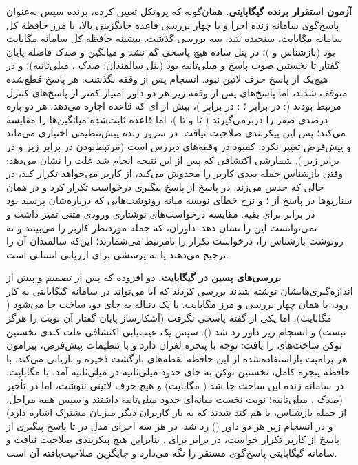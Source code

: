 \textbf{آزمون استقرار برنده  گیگابایتی.} همان‌گونه که پروتکل تعیین کرده، برنده
سپس به‌عنوان پاسخ‌گوی سامانه زنده اجرا و با چهار بررسی قاعده جایگزینی بالا، با مرز
حافظه کل سامانه  مگابایت، سنجیده شد. سه بررسی گذشت. بیشینه حافظه کل
سامانه  مگابایت بود (بازشناس  و  )؛ در
پنل ساده هیچ پاسخی گم نشد و میانگین و صدک  فاصله پایان گفتار تا نخستین صوت
پاسخ  و  میلی‌ثانیه بود (پنل سالمندان: صدک ، 
میلی‌ثانیه)؛ و در هیچ‌یک از  پاسخ حرف لاتین نبود. انسجام پس از وقفه
نگذشت: هر  پاسخ قطع‌شده متوقف شدند، اما پاسخ‌های پس از وقفه زیر هر دو داور
 امتیاز کمتر از پاسخ‌های کنترل مرتبط بودند (:  در برابر
؛ :  در برابر )، بیش از ای که قاعده
اجازه می‌دهد. هر دو بازه  درصدی صفر را دربرمی‌گیرند ( تا 
و  تا )، اما قاعده ثابت‌شده میانگین‌ها را مقایسه می‌کند؛ پس این
پیکربندی صلاحیت نیافت. در سرور زنده پیش‌تنظیمی اختیاری می‌ماند و پیش‌فرض تغییر
نکرد. کمبود در وقفه‌های دیررس است (مرتبط‌بودن  در برابر  زیر
 و  در برابر  زیر ). شمارشی اکتشافی که
پس از این نتیجه انجام شد علت را نشان می‌دهد: وقتی بازشناس جمله بعدی کاربر را
مخدوش می‌کند،  از کاربر می‌خواهد تکرار کند، در حالی که
 حدس می‌زند.  در  پاسخ از  پاسخ پیگیری
درخواست تکرار کرد و  در همان سناریوها در  پاسخ از ؛ و
نرخ خطای نویسه میانه رونوشت‌هایی که  درباره‌شان پرسید  بود در
برابر  برای بقیه. مقایسه درخواست‌های نوشتاری ورودی متنی تمیز داشت و
نمی‌توانست این را نشان دهد. داوران، که جمله موردنظر کاربر را می‌بینند و نه رونوشت
بازشناس را، درخواست تکرار را نامرتبط می‌شمارند؛ این‌که سالمندان آن را ترجیح
می‌دهند یا نه پرسشی برای ارزیابی انسانی است.

\textbf{بررسی‌های پسین در  گیگابایت.} دو افزوده که پس از تصمیم و پیش از
اندازه‌گیری‌هایشان نوشته شدند بررسی کردند که آیا  می‌تواند در سامانه
 گیگابایتی به کار رود، با همان چهار بررسی و مرز  مگابایت. با یک
دنباله به جای دو، ساخت  جا می‌شود ( مگابایت)، اما یکی از 
گفته پاسخی نگرفت (آشکارساز پایان گفتار آن نوبت را هرگز نبست) و انسجام زیر داور
 رد شد (). سپس یک عیب‌یابی اکتشافی علت کندی نخستین توکن
ساخت‌های  را یافت:  توجه با پنجره لغزان دارد و
 با تنظیمات پیش‌فرض، پیرامون هر پرامپت بازاستفاده‌شده از این حافظه
نقطه‌های بازگشت ذخیره و بازیابی می‌کند. با حافظه پنجره کامل، نخستین توکن به جای
حدود  میلی‌ثانیه در  میلی‌ثانیه آمد، با  مگابایت. در
سامانه زنده این ساخت جا شد ( مگابایت) و هیچ حرف لاتینی ننوشت، اما در
تأخیر (صدک ،  میلی‌ثانیه؛  نوبت نخست میانه‌ای حدود 
میلی‌ثانیه داشتند و سپس همه مراحل، از جمله بازشناس، با هم کند شدند که به بار
کاربران دیگر میزبان مشترک اشاره دارد) و در انسجام زیر هر دو داور () رد
شد. در هر سه اجرای  مدل در  تا  پاسخ پیگیری از 
پاسخ از کاربر تکرار خواست، در برابر  برای . بنابراین هیچ
پیکربندی  صلاحیت نیافت و سامانه  گیگابایتی پاسخ‌گوی
مستقر را نگه می‌دارد و  جایگزین صلاحیت‌یافته آن است.

